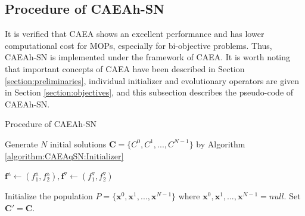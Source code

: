 \documentclass[10pt, journal]{IEEEtran}
\begin{document}
\subsection{Procedure of CAEAh-SN}\label{section:CAEAqSN:procedure}
It is verified that CAEA shows an excellent performance and has lower computational cost for MOPs, especially for bi-objective problems. Thus, CAEAh-SN is implemented under the framework of CAEA. It is worth noting that important concepts of CAEA have been described in Section \ref{section:preliminaries},  individual initializer and evolutionary operators are given in Section \ref{section:objectives}, and this subsection describes the pseudo-code of CAEAh-SN.
\begin{algorithm}[!htbp]
	\caption{Procedure of CAEAh-SN} \label{algorithm:CAEAh-SN}
	

    {Generate $N$ initial solutions $\textbf{C}=\{C^0,C^1,...,C^{N-1} \}$
     by Algorithm \ref{algorithm:CAEAqSN:Initializer}
    }


    {$\mathbf{f}^{\vartriangle} \leftarrow (f_{1}^{\vartriangle},f_{2}^{\vartriangle}),
     \mathbf{f}^{\triangledown} \leftarrow (f_{1}^{\triangledown},f_{2}^{\triangledown})$
    }

    {Initialize the population $P=\{\textbf{x}^0,\textbf{x}^1,...,\textbf{x}^{N-1} \}$ where $\textbf{x}^0,\textbf{x}^1,...,\textbf{x}^{N-1}=null$. Set $\textbf{C}'=\textbf{C}$.
    }


    \label{algorithm:CAEAqSN:initend}


\end{algorithm}
\end{document}
